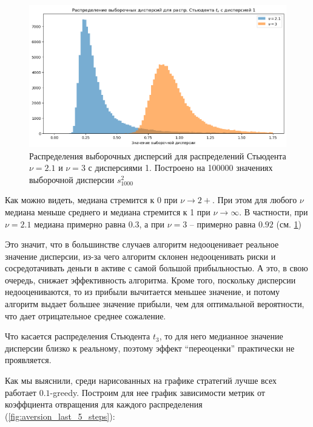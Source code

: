 \begin{figure}[ht!] %
\centering
\includegraphics[width=5in]{theory_tester/theory_images/distributions_of_sample_variances.png}
\caption{Распределения выборочных дисперсий для распределений Стьюдента $\nu=2.1$ и $\nu=3$ с дисперсиями 1. Построено на 100000 значениях выборочной дисперсии $s_{1000}^2$}
\label{fig:distributions_of_sample_variances}
\end{figure}

Как можно видеть, медиана стремится к 0 при $\nu \to 2+$. При этом для любого $\nu$ медиана меньше среднего и медиана стремится к 1 при $\nu \to \infty$. В частности, при $\nu=2.1$ медиана примерно равна $0.3$, а при $\nu=3$ -- примерно равна $0.92$ (см. \ref{fig:distributions_of_sample_variances})

Это значит, что в большинстве случаев алгоритм недооценивает реальное значение дисперсии, из-за чего алгоритм склонен недооценивать риски и сосредотачивать деньги в активе с самой большой прибыльностью. А это, в свою очередь, снижает эффективность алгоритма. \label{negative_regret} Кроме того, поскольку дисперсии недооцениваются, то из прибыли вычитается меньшее значение, и потому алгоритм выдает большее значение прибыли, чем для оптимальной вероятности, что дает отрицательное среднее сожаление.

Что касается распределения Стьюдента $t_3$, то для него медианное значение дисперсии близко к реальному, поэтому эффект ``переоценки'' практически не проявляется.

Как мы выяснили, среди нарисованных на графике стратегий лучше всех работает $0.1$-greedy. Построим для нее график зависимости метрик от коэффциента отвращения для каждого распределения (\ref{fig:aversion_last_5_steps}):


